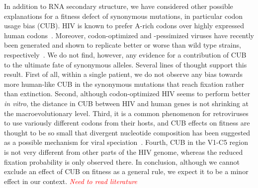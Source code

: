 \documentclass[rmp, twocolumn]{revtex4}
\newcommand{\comment}[1]{\textit{\textcolor{red}{#1}}}
\begin{document}
In addition to RNA secondary structure, we have considered other possible
explanations for a fitness defect of synonymous mutations, in particular codon
usage bias (CUB). HIV is known to prefer A-rich codons over highly expressed
human codons~\citep{jenkins_extent_2003}. Moreover, codon-optimized
and -pessimized viruses have recently been generated and shown to replicate
better or worse than wild type strains,
respectively~\citep{li_codon-usage-based_2012, ngumbela_quantitative_2008,
coleman_virus_2008}. We do not find, however, any evidence for a contribution of
CUB to the ultimate fate of synonymous alleles. Several lines of thought support
this result. First of all, within a single patient, we do not observe any bias
towards more human-like CUB in the synonymous mutations that reach fixation
rather than extinction. Second, although codon-optimized HIV seems to perform
better {\it in vitro}, the distance in CUB between HIV and human genes is not
shrinking at the macroevolutionary level. Third, it is a common phenomenon for
retroviruses to use variously different codons from their hosts, and CUB effects
on fitness are thought to be so small that divergent nucleotide composition has
been suggested as a possible mechanism for viral
speciation~\citep{bronson_nucleotide_1994}. Fourth, CUB in the V1-C5 region is
not very different from other parts of the HIV genome, whereas the reduced
fixation probability is only observed there. In conclusion, although we cannot
exclude an effect of CUB on fitness as a general rule, we expect it to be a
minor effect in our context. \comment{Need to read literature}
\end{document}
